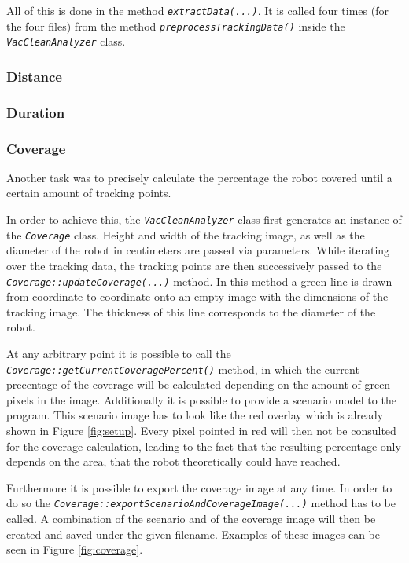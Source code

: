 \documentclass[twoside]{article}
\begin{document}
All of this is done in the method \textit{\texttt{extractData(...)}}. It is called four times (for the four files) from the method \textit{\texttt{preprocessTrackingData()}} inside the \textit{\texttt{VacCleanAnalyzer}} class.

\subsubsection{Distance} %
\subsubsection{Duration} %
\subsubsection{Coverage} %

Another task was to precisely calculate the percentage the robot covered until a certain amount of tracking points.

In order to achieve this, the \textit{\texttt{VacCleanAnalyzer}} class first generates an instance of the \textit{\texttt{Coverage}} class.
Height and width of the tracking image, as well as the diameter of the robot in centimeters are passed via parameters.
While iterating over the tracking data, the tracking points are then successively passed to the \textit{\texttt{Coverage::updateCoverage(...)}} method.
In this method a green line is drawn from coordinate to coordinate onto an empty image with the dimensions of the tracking image.
The thickness of this line corresponds to the diameter of the robot.

At any arbitrary point it is possible to call the \textit{\texttt{Coverage::getCurrentCoveragePercent()}} method, in which the current precentage of the coverage will be calculated depending on the amount of green pixels in the image.
Additionally it is possible to provide a scenario model to the program.
This scenario image has to look like the red overlay which is already shown in Figure \ref{fig:setup}.
Every pixel pointed in red will then not be consulted for the coverage calculation, leading to the fact that the resulting percentage only depends on the area, that the robot theoretically could have reached.

Furthermore it is possible to export the coverage image at any time.
In order to do so the \textit{\texttt{Coverage::exportScenarioAndCoverageImage(...)}} method has to be called.
A combination of the scenario and of the coverage image will then be created and saved under the given filename.
Examples of these images can be seen in Figure \ref{fig:coverage}.
\end{document}

